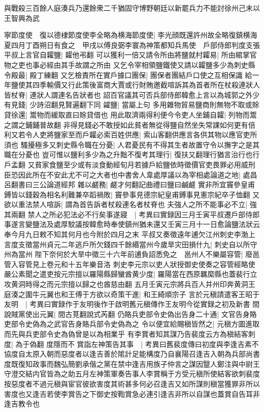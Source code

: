 與戰殺三百餘人庭湊兵乃還餘衆二千猶固守博野朝廷以新罷兵力不能討徐州己未以王智興為武

寧節度使　復以德棣節度使李全略為横海節度使|{
	李光顔既還許州故全略復鎮横海}
夏四月丁酉朔日有食之　甲戌以傅良弼李寰為神策都知兵馬使　戶部侍郎判度支張平叔上言官自糶鹽|{
	糶他弔翻}
可以獲利一倍又請令所由將鹽就村糶易|{
	所由綰掌官物之吏也事必經由其手故謂之所由}
又乞令宰相領鹽鐵使又請以糶鹽多少為刺史縣令殿最|{
	殿丁練翻}
又乞檢責所在實戶據口團保|{
	團保者團結戶口使之互相保識}
給一年鹽使其四季輸價又行此策後富商大賈或行財賄邀截喧訴其為首者所在杖殺連狀人皆杖脊|{
	連狀人謂連名告狀者也}
詔百官議其可否兵部侍郎韓愈上言以為城郭之外少有見錢|{
	少詩沼翻見賢遍翻下同}
糴鹽|{
	當屬上句}
多用雜物貿易鹽商則無物不取或賖貸徐還|{
	鬻物而緩取直曰賖貸借也}
用此取濟兩得利便今令吏人坐鋪自糶|{
	列物而鬻之謂之鋪鋪普故翻}
非得見錢必不敢授如此貧者無從得鹽自然坐失常課如何更有倍利又若令人吏將鹽家至而戶糶必索百姓供應|{
	索山客翻供應言各供其物以應官吏所須也}
騷擾極多又刺史縣令職在分憂|{
	人君憂民有不得其生者故置守令以撫字之是其職在分憂也}
豈可惟以鹽利多少為之升黜不復考其理行|{
	復扶又翻理行猶言治行也行戶孟翻}
又貧家食鹽至少或有淡食動經旬月若據戶給鹽依時徵價官吏畏罪必用威刑臣恐因此所在不安此尤不可之大者也中書舍人韋處厚議以為宰相處論道之地|{
	處昌呂翻書曰三公論道經邦}
雜以鹺務|{
	鹺才何翻記曲禮曰鹽曰鹹鹺}
實非所宜竇參皇甫鎛皆以錢穀為相名利難兼卒蹈禍敗|{
	竇參事見德宗紀皇甫鎛事見憲宗紀卒子恤翻}
又欲以重法禁人喧訴|{
	謂為首告訴者杖殺連名者杖脊也}
夫強人之所不能事必不立|{
	強其兩翻}
禁人之所必犯法必不行矣事遂寢　|{
	考異曰實録因三月壬寅平叔遷戶部侍郎事遂言變鹽法及處厚駮議按韓愈時奉使鎮州猶未還又壬寅三月十一日愈論鹽法狀云奉今月九日敕不知其何月也今附於四月之末}
平叔又奏徵遠年逋欠江州刺史李渤上言度支徵當州貞元二年逃戶所欠錢四千餘緡當州今歲旱灾田損什九|{
	刺史自以所守州為當州}
陛下奈何於大旱中徵三十六年前逋負詔悉免之　邕州人不樂屬容管|{
	廢邕管入容管見上卷元和十五年樂音洛}
刺史李元宗以吏人狀授御史使奏之容管經略使嚴公素聞之遣吏按元宗擅以羅陽縣歸蠻酋黄少度|{
	羅陽當在西原羈縻縣也蓋裴行立攻黄洞時得之而元宗擅以歸之也酋慈由翻}
五月壬寅元宗將兵百人并州印奔黄洞王庭湊之圍牛元翼也和王傅于方欲以奇策干進|{
	和王綺順宗子}
言於元稹請遣客王昭于友明　|{
	考異曰實録作于友明後作于啟明舊元稹傳作王友明今從實録之初及新書}
間說賊黨使出元翼|{
	間古莧翻說式芮翻}
仍賂兵吏部令史偽出告身二十通|{
	文官告身賂吏部令史偽為之武官告身賂兵部令史偽為之}
令以便宜給賜稹皆然之|{
	元稹方圖進取而先與兵吏部令史為偽曾是以為相業乎}
有李賞者知其謀乃告裴度云方為稹結客刺度|{
	為于偽翻}
度隱而不賞詣左神策告其事　|{
	考異曰舊裴度傳曰初度與李逢吉素不協度自太原入朝而惡度者以逢吉善於隂計足能構度乃自襄陽召逢吉入朝為兵部尚書度既復知政事而魏弘簡劉承偕之黨在禁中逢吉用族子仲言之謀因毉人鄭注與中尉王守澄交結内官皆為之助五月左神策軍奏告事人李賞稱于方受元稹所使結客欲刺裴度按惡度者不過元稹與宦官彼欲害度其術甚多何必召逢吉又如所謀則稹當獲罪非所以害度也又逢吉若使李賞告之下御史按鞫賞急必連引逢吉非所以自謀也蓋賞自告耳非逢吉教令也}
